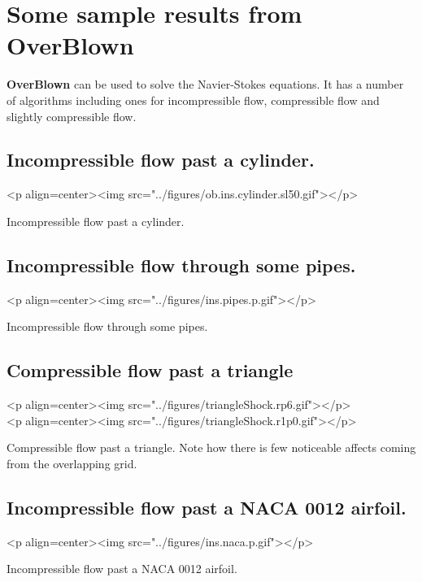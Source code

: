 \documentclass{article}
\begin{document}
\section{Some sample results from OverBlown}

{\bf OverBlown} can be used to solve the Navier-Stokes equations. It 
has a number of algorithms including ones for incompressible flow,
compressible flow and slightly compressible flow.

\subsection{Incompressible flow past a cylinder.}
\begin{rawhtml}
<p align=center><img src="../figures/ob.ins.cylinder.sl50.gif"></p>
\end{rawhtml}
\begin{flushleft}
{\LARGE Incompressible flow past a cylinder.}
\end{flushleft}

\subsection{Incompressible flow through some pipes.}
\begin{rawhtml}
<p align=center><img src="../figures/ins.pipes.p.gif"></p>
\end{rawhtml}
\begin{flushleft}
{\LARGE Incompressible flow through some pipes.}
\end{flushleft}


\subsection{Compressible flow past a triangle}
\begin{rawhtml}
<p align=center><img src="../figures/triangleShock.rp6.gif"></p> \\
<p align=center><img src="../figures/triangleShock.r1p0.gif"></p> 
\end{rawhtml}
\begin{flushleft}
{\LARGE Compressible flow past a triangle. Note how there is few noticeable affects
    coming from the overlapping grid.}
\end{flushleft}

\subsection{Incompressible flow past a NACA 0012 airfoil.}
\begin{rawhtml}
<p align=center><img src="../figures/ins.naca.p.gif"></p>
\end{rawhtml}
\begin{flushleft}
{\LARGE Incompressible flow past a NACA 0012 airfoil.}
\end{flushleft}
\end{document}

